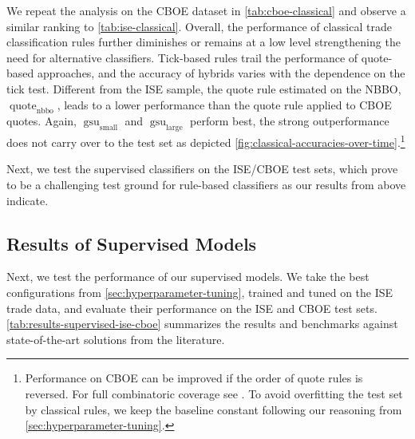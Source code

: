 We repeat the analysis on the \gls{CBOE} dataset in \cref{tab:cboe-classical} and observe a similar ranking to \cref{tab:ise-classical}. Overall, the performance of classical trade classification rules further diminishes or remains at a low level strengthening the need for alternative classifiers. Tick-based rules trail the performance of quote-based approaches, and the accuracy of hybrids varies with the dependence on the tick test. Different from the \gls{ISE} sample, the quote rule estimated on the \gls{NBBO}, $\operatorname{quote}_{\mathrm{nbbo}}$, leads to a lower performance than the quote rule applied to \gls{CBOE} quotes.
Again, $\operatorname{gsu}_{\mathrm{small}}$ and $\operatorname{gsu}_{\mathrm{large}}$ perform best, the strong outperformance does not carry over to the test set as depicted \cref{fig:classical-accuracies-over-time}.\footnote{Performance on \gls{CBOE} can be improved if the order of quote rules is reversed. For full combinatoric coverage see \textcite[][33]{grauerOptionTradeClassification2022}. To avoid overfitting the test set by classical rules, we keep the baseline constant following our reasoning from \cref{sec:hyperparameter-tuning}.}


Next, we test the supervised classifiers on the \gls{ISE}/\gls{CBOE} test sets, which prove to be a challenging test ground for rule-based classifiers as our results from above indicate.

\subsection{Results of Supervised
    Models}\label{sec:results-of-supervised-models}

Next, we test the performance of our supervised models. We take the best configurations from \cref{sec:hyperparameter-tuning}, trained and tuned on the \gls{ISE} trade data, and evaluate their performance on the \gls{ISE} and \gls{CBOE} test sets. \cref{tab:results-supervised-ise-cboe} summarizes the results and benchmarks against state-of-the-art solutions from the literature.

